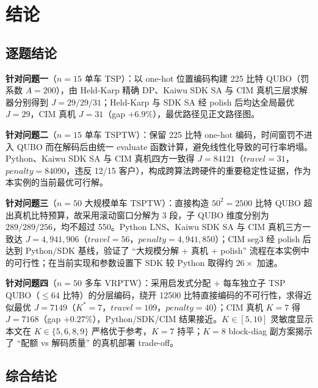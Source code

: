 \documentclass[UTF8,12pt,a4paper]{ctexart}
\begin{document}
\section{结论}

\subsection{逐题结论}

\textbf{针对问题一}（$n\!=\!15$ 单车 TSP）：以 one-hot 位置编码构建 225 比特 QUBO（罚系数 $A\!=\!200$），由 Held-Karp 精确 DP、Kaiwu SDK SA 与 CIM 真机三层求解器分别得到 $J\!=\!29/29/31$；Held-Karp 与 SDK SA 经 polish 后均达全局最优 $J\!=\!29$，CIM 真机 $J\!=\!31$（gap $+6.9\%$），最优路径见正文路径图。

\textbf{针对问题二}（$n\!=\!15$ 单车 TSPTW）：保留 225 比特 one-hot 编码，时间窗罚不进入 QUBO 而在解码后由统一 evaluate 函数计算，避免线性化导致的可行率坍塌。Python、Kaiwu SDK SA 与 CIM 真机四方一致得 $J\!=\!84121$（$travel\!=\!31$，$penalty\!=\!84090$，违反 12/15 客户），构成跨算法跨硬件的重要稳定性证据，作为本实例的当前最优可行解。

\textbf{针对问题三}（$n\!=\!50$ 大规模单车 TSPTW）：直接构造 $50^2\!=\!2500$ 比特 QUBO 超出真机比特预算，故采用滚动窗口分解为 3 段，子 QUBO 维度分别为 $289/289/256$，均不超过 550。Python LNS、Kaiwu SDK SA 与 CIM 真机三方一致达 $J\!=\!4{,}941{,}906$（$travel\!=\!56$，$penalty\!=\!4{,}941{,}850$）；CIM seg3 经 polish 后达到 Python/SDK 基线，验证了 ``大规模分解 + 真机 + polish'' 流程在本实例中的可行性；在当前实现和参数设置下 SDK 较 Python 取得约 $26\times$ 加速。

\textbf{针对问题四}（$n\!=\!50$ 多车 VRPTW）：采用启发式分配 $+$ 每车独立子 TSP QUBO（$\le\!64$ 比特）的分层编码，绕开 12500 比特直接编码的不可行性，求得近似最优 $J\!=\!7149$（$K^{\ast}\!=\!7$，$travel\!=\!109$，$penalty\!=\!40$）；CIM 真机 $K\!=\!7$ 得 $J\!=\!7168$（gap $+0.27\%$），Python/SDK/CIM 结果接近。$K\!\in\![5,10]$ 灵敏度显示本文在 $K\!\in\!\{5,6,8,9\}$ 严格优于参考，$K\!=\!7$ 持平；$K\!=\!8$ block-diag 副方案揭示了 ``配额 vs 解码质量'' 的真机部署 trade-off。

\subsection{综合结论}
\end{document}
